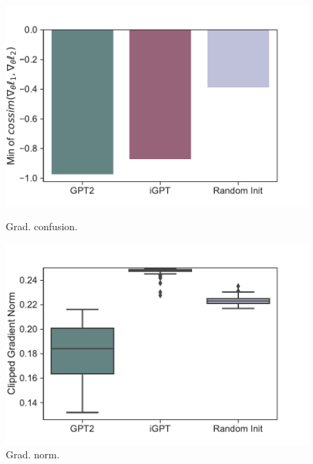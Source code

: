 \begin{figure}[ht]
    \centering
    \begin{minipage}[b]{0.32\linewidth}
        \includegraphics[width=\linewidth]{figs/mingradcossim_1_gpt2_igpt_dt_hopper_medium_666.pdf}
        \caption{Grad. confusion.}
        \label{fig:grad-confusion}
    \end{minipage}
    \begin{minipage}[b]{0.32\linewidth}
        \includegraphics[width=\linewidth]{figs/gradnorms_1_gpt2_igpt_dt_hopper_medium_666.pdf}
        \caption{Grad. norm.}
        \label{fig:grad-norm}
    \end{minipage}
    \begin{minipage}[b]{0.32\linewidth}

\end{minipage}
\end{figure}

